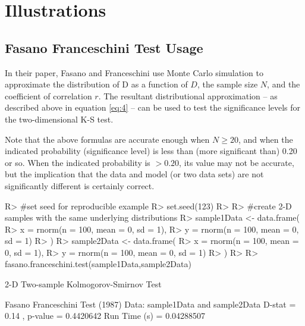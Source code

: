 \documentclass[codesnippet]{jss}
\begin{document}


\section{Illustrations} \label{sec:illustrations}

\subsection{Fasano Franceschini Test Usage}

In their paper, Fasano and Franceschini use Monte Carlo simulation to approximate the distribution of D as a function of $D$, the sample size $N$, and the coefficient of correlation $r$. The resultant distributional approximation -- as described above in equation \ref{eq:4} -- can be used to test the significance levels for the two-dimensional K-S test.

Note that the above formulas are accurate enough when $N \geq 20$, and when the indicated probability (significance level) is less than (more significant than) 0.20 or so. When the indicated probability is $> 0.20$, its value may not be accurate, but the implication that the data and model (or two data sets) are not significantly different is certainly correct.

\begin{CodeChunk}
\begin{CodeInput}
R> #set seed for reproducible example
R> set.seed(123)
R>
R> #create 2-D samples with the same underlying distributions
R> sample1Data <- data.frame(
R>  x = rnorm(n = 100, mean = 0, sd = 1),
R>  y = rnorm(n = 100, mean = 0, sd = 1)
R> )
R> sample2Data <- data.frame(
R>  x = rnorm(n = 100, mean = 0, sd = 1),
R>  y = rnorm(n = 100, mean = 0, sd = 1)
R> )
R>
R> fasano.franceschini.test(sample1Data,sample2Data)
\end{CodeInput}
\begin{CodeOutput}
      2-D Two-sample Kolmogorov-Smirnov Test

 Fasano Franceschini Test (1987)
 Data:  sample1Data and sample2Data
 D-stat =  0.14 , p-value =  0.4420642
 Run Time (s) =  0.04288507
\end{CodeOutput}
\end{CodeChunk}
\end{document}
